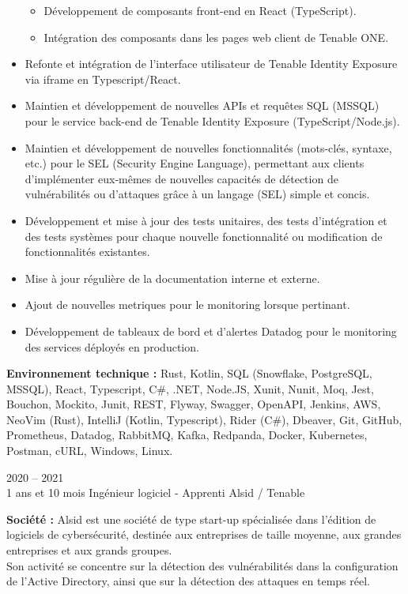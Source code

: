 \documentclass[8pt]{developercv} %
\begin{document}
\begin{itemize}
\begin{itemize}
            \item Développement de composants front-end en React (TypeScript).
            \item Intégration des composants dans les pages web client de Tenable ONE.
        \end{itemize}
    \item Refonte et intégration de l’interface utilisateur de Tenable Identity Exposure via iframe en Typescript/React.
    \item Maintien et développement de nouvelles APIs et requêtes SQL (MSSQL) pour le service back-end de Tenable Identity Exposure (TypeScript/Node.js).
    \item Maintien et développement de nouvelles fonctionnalités (mots-clés, syntaxe, etc.) pour le SEL (Security Engine Language), permettant aux clients d'implémenter eux-mêmes de nouvelles capacités de détection de vulnérabilités ou d'attaques grâce à un langage (SEL) simple et concis.
    \item Développement et mise à jour des tests unitaires, des tests d’intégration et des tests systèmes pour chaque nouvelle fonctionnalité ou modification de fonctionnalités existantes.
    \item Mise à jour régulière de la documentation interne et externe.
    \item Ajout de nouvelles metriques pour le monitoring lorsque pertinant.
    \item Développement de tableaux de bord et d'alertes Datadog pour le monitoring des services déployés en production.
\end{itemize}
\vspace{\baselineskip}
\textbf{Environnement technique :} Rust, Kotlin, SQL (Snowflake, PostgreSQL, MSSQL), React, Typescript, C\#, .NET, Node.JS, Xunit, Nunit, Moq, Jest, Bouchon, Mockito, Junit, REST, Flyway, Swagger, OpenAPI, Jenkins, AWS, NeoVim (Rust), IntelliJ (Kotlin, Typescript), Rider (C\#), Dbeaver, Git, GitHub, Prometheus, Datadog, RabbitMQ, Kafka, Redpanda, Docker, Kubernetes, Postman, cURL, Windows, Linux.\\
\vspace{\baselineskip}
\begin{entrylisthrules}
    \entry
    {2020 -- 2021\\\footnotesize{1 ans et 10 mois}}
    {Ingénieur logiciel - Apprenti}
    {Alsid / Tenable}
    {}
\end{entrylisthrules}

\textbf{Société :} Alsid est une société de type start-up spécialisée dans l'édition de logiciels de cybersécurité, destinée aux entreprises de taille moyenne, aux grandes entreprises et aux grands groupes.\\
Son activité se concentre sur la détection des vulnérabilités dans la configuration de l'Active Directory, ainsi que sur la détection des attaques en temps réel.\\
\end{document}

